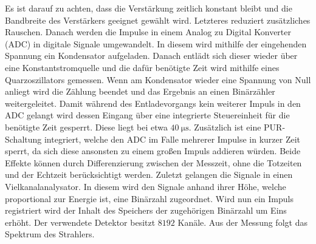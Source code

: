Es ist darauf zu achten, dass die Verstärkung zeitlich konstant bleibt und die Bandbreite des Verstärkers geeignet gewählt wird. Letzteres reduziert zusätzliches Rauschen. Danach werden die Impulse in einem Analog zu Digital Konverter (ADC) in digitale Signale umgewandelt. In diesem wird mithilfe der eingehenden Spannung ein Kondensator aufgeladen. Danach entlädt sich dieser wieder über eine Konstantstromquelle und die dafür benötigte Zeit wird mithilfe eines Quarzoszillators gemessen. Wenn am Kondensator wieder eine Spannung von Null anliegt wird die Zählung beendet und das Ergebnis an einen Binärzähler weitergeleitet. Damit während des Entladevorgangs kein weiterer Impuls in den ADC gelangt wird dessen Eingang über eine integrierte Steuereinheit für die benötigte Zeit gesperrt. Diese liegt bei etwa $\SI{40}{\micro\second}$. Zusätzlich ist eine PUR-Schaltung integriert, welche den ADC im Falle mehrerer Impulse in kurzer Zeit sperrt, da sich diese ansonsten zu einem großen Impuls addieren würden. Beide Effekte können durch Differenzierung zwischen der Messzeit, ohne die Totzeiten und der Echtzeit berücksichtigt werden. Zuletzt gelangen die Signale in einen Vielkanalanalysator. In diesem wird den Signale anhand ihrer Höhe, welche proportional zur Energie ist, eine Binärzahl zugeordnet. Wird nun ein Impuls registriert wird der Inhalt des Speichers der zugehörigen Binärzahl um Eins erhöht. Der verwendete Detektor besitzt $8192$ Kanäle. Aus der Messung folgt das Spektrum des Strahlers.